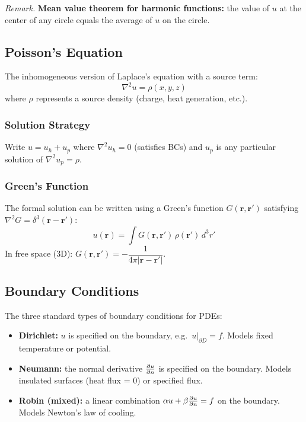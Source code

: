 \documentclass[11pt, letterpaper]{article}
\theoremstyle{plain}
\newenvironment{remark}{\smallskip\noindent\textit{Remark.}}{\smallskip}
\newcommand{\vv}[1]{\bm{#1}}
\begin{document}
\begin{remark}
    \textbf{Mean value theorem for harmonic functions:} the value of $u$
    at the center of any circle equals the average of $u$ on the circle.
\end{remark}


\subsection{Poisson's Equation}

The inhomogeneous version of Laplace's equation with a source term:
\[
    \nabla^2 u = \rho(x,y,z)
\]
where $\rho$ represents a source density (charge, heat generation, etc.).

\subsubsection*{Solution Strategy}
Write $u = u_h + u_p$ where $\nabla^2 u_h = 0$ (satisfies BCs) and
$u_p$ is any particular solution of $\nabla^2 u_p = \rho$.

\subsubsection*{Green's Function}
The formal solution can be written using a Green's function $G(\vv{r},\vv{r}')$
satisfying $\nabla^2 G = \delta^3(\vv{r}-\vv{r}')$:
\[
    u(\vv{r}) = \int G(\vv{r},\vv{r}')\,\rho(\vv{r}')\,d^3r'
\]
In free space (3D): $G(\vv{r},\vv{r}') = -\dfrac{1}{4\pi|\vv{r}-\vv{r}'|}$.


\subsection{Boundary Conditions}

The three standard types of boundary conditions for PDEs:
\begin{itemize}
    \item \textbf{Dirichlet:} $u$ is specified on the boundary,
          e.g.\ $u\big|_{\partial D} = f$. Models fixed temperature or potential.
    \item \textbf{Neumann:} the normal derivative $\pdv{u}{n}$ is specified
          on the boundary. Models insulated surfaces (heat flux = 0) or
          specified flux.
    \item \textbf{Robin (mixed):} a linear combination
          $\alpha u + \beta\pdv{u}{n} = f$ on the boundary.
          Models Newton's law of cooling.
\end{itemize}
\end{document}

